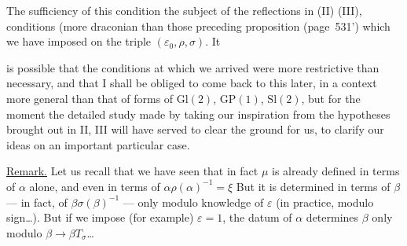 
The sufficiency of this condition 
the subject of the reflections in (II) (III),
 conditions (more draconian than those
 preceding proposition (page~531') which we
have imposed on the triple $(\varepsilon_0,\rho,\sigma)$. It



is possible that the conditions at which we
 arrived were more restrictive
than necessary, and that I shall be obliged
to come back to this later, in a context
more general than that of forms of
$\mathrm{Gl}(2)$, $\mathrm{GP}(1)$, $\mathrm{Sl}(2)$, but for the moment
the detailed study made by taking our inspiration
from the hypotheses brought out in  II, III will
have served to clear the ground for us, to clarify
our ideas on an important particular
case.

\uline{Remark.} Let us recall that we have seen that in
fact $\mu$ is already defined in terms of $\alpha$ alone,
and even in terms of $\alpha\rho(\alpha)^{-1}=\xi$ \unsure{;} 
But it is determined in terms of $\beta$
--- in fact, of $\beta\sigma(\beta)^{-1}$ --- only modulo
knowledge of $\varepsilon$ (in practice, modulo
sign\ldots). But if we impose (for example) $\varepsilon=1$,
the datum of $\alpha$ determines $\beta$ only
modulo \deleted{$\unsure{\beta}$} $\beta\longrightarrow\beta T_\sigma$\ldots



